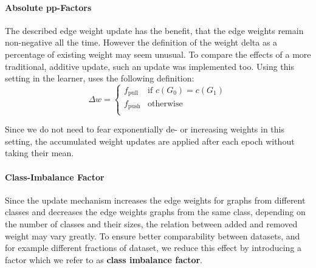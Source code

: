 	\paragraph{Absolute pp-Factors}
	The described edge weight update has the benefit, that the edge weights remain non-negative all the time.
	However the definition of the weight delta as a percentage of existing weight may seem unusual.
	To compare the effects of a more traditional, additive update, such an update was implemented too.
	Using this setting in the learner, uses the following definition: 
	\begin{equation}\label{eq:DeltaW_Abs_pp_factors}
		\Delta w = \begin{cases}
			f_{\text{pull}} &\text{if } c(G_0) = c(G_1)\\
			f_{\text{push}} &\text{otherwise}\\
		\end{cases} 
	\end{equation}
	
	Since we do not need to fear exponentially de- or increasing weights in this setting, the accumulated weight updates are applied after each epoch without taking their mean.
	
	\paragraph{Class-Imbalance Factor}
	Since the update mechanism increases the edge weights for graphs from different classes and decreases the edge weights graphs from the same class, 
	depending on the number of classes and their sizes, the relation between added and removed weight may vary greatly.
	To ensure better comparability between datasets, and for example different fractions of dataset, we reduce this effect by introducing a factor which we refer to as \textbf{class imbalance factor}.
	
